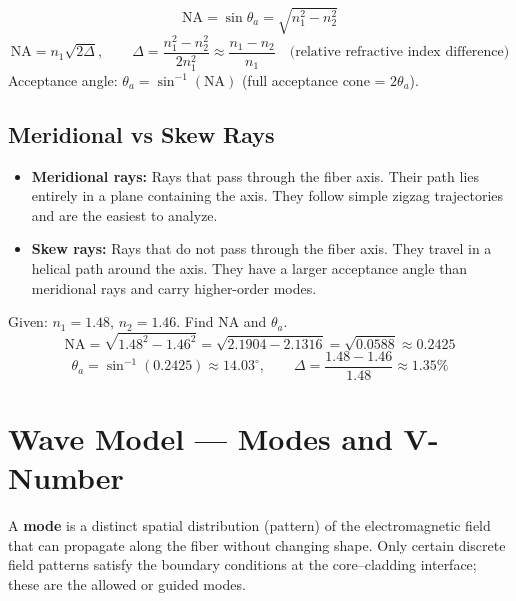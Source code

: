 \documentclass[12pt,a4paper]{article}
\begin{document}
\begin{tcolorbox}[formulabox, title={\textbf{Numerical Aperture --- Complete Formula}}]
\[
\text{NA} = \sin\theta_a = \sqrt{n_1^2 - n_2^2}
\]
\[
\text{NA} = n_1\sqrt{2\Delta}, \qquad \Delta = \frac{n_1^2 - n_2^2}{2n_1^2} \approx \frac{n_1 - n_2}{n_1} \quad \text{(relative refractive index difference)}
\]
Acceptance angle: $\theta_a = \sin^{-1}(\text{NA})$ \quad (full acceptance cone = $2\theta_a$).
\end{tcolorbox}

\subsection{Meridional vs Skew Rays}
\begin{itemize}[leftmargin=*, itemsep=3pt]
  \item \textbf{Meridional rays:} Rays that pass through the fiber axis. Their path lies entirely in a plane containing the axis. They follow simple zigzag trajectories and are the easiest to analyze.
  \item \textbf{Skew rays:} Rays that do not pass through the fiber axis. They travel in a helical path around the axis. They have a larger acceptance angle than meridional rays and carry higher-order modes.
\end{itemize}

\begin{tcolorbox}[examplebox, title={\textbf{Worked Example: Calculate NA and Acceptance Angle}}]
Given: $n_1 = 1.48$, $n_2 = 1.46$. Find NA and $\theta_a$.
\[
\text{NA} = \sqrt{1.48^2 - 1.46^2} = \sqrt{2.1904 - 2.1316} = \sqrt{0.0588} \approx 0.2425
\]
\[
\theta_a = \sin^{-1}(0.2425) \approx 14.03^\circ, \qquad \Delta = \frac{1.48 - 1.46}{1.48} \approx 1.35\%
\]
\end{tcolorbox}

\section{Wave Model --- Modes and V-Number}

\begin{tcolorbox}[defbox, title={\textbf{Modes in an Optical Fiber}}]
A \textbf{mode} is a distinct spatial distribution (pattern) of the electromagnetic field that can propagate along the fiber without changing shape. Only certain discrete field patterns satisfy the boundary conditions at the core--cladding interface; these are the allowed or guided modes.
\end{tcolorbox}
\end{document}

